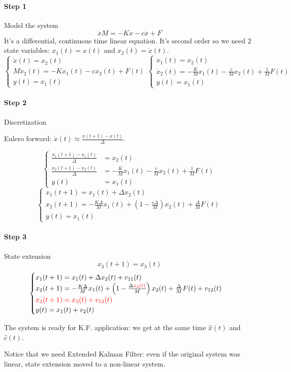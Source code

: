 \begin{example}
    \paragraph{Step 1} Model the system
    \[
        \ddot{x}M = -Kx - c\dot{x} + F
    \]
    It's a differential, continuous time linear equation.
    It's second order so we need 2 state variables: $x_1(t) = x(t)$ and $x_2(t) = \dot{x}(t)$.
    \[
        \begin{cases}
            \dot{x}(t) = x_2(t) \\
            M\dot{x}_2(t) = -Kx_1(t) -cx_2(t) + F(t) \\
            y(t) = x_1(t)
        \end{cases}
        \begin{cases}
            \dot{x}_1(t) = x_2(t) \\
            \dot{x}_2(t) = -\frac{K}{M} x_1(t) - \frac{c}{M} x_2(t) + \frac{1}{M}F(t) \\
            y(t) = x_1(t)
        \end{cases}
    \]

    \paragraph{Step 2} Discretization

    Eulero forward: $\dot{x}(t) \approx \frac{x(t+1)-x(t)}{\Delta}$.

    \[
        \begin{cases}
            \frac{x_1(t+1)-x_1(t)}{\Delta} &= x_2(t) \\
            \frac{x_2(t+1)-x_2(t)}{\Delta} &= -\frac{K}{M} x_1(t) - \frac{c}{M} x_2(t) + \frac{1}{M}F(t) \\
            y(t) &= x_1(t)
        \end{cases}
    \]
    \[
        \begin{cases}
            x_1(t+1) = x_1(t) + \Delta x_2(t) \\
            x_2(t+1) = -\frac{K\Delta}{M}x_1(t) + \left(1-\frac{c\Delta}{M}\right)x_2(t) + \frac{\Delta}{M}F(t) \\
            y(t) = x_1(t)
        \end{cases}
    \]

    \paragraph{Step 3} State extension
    \[
        x_3(t+1) = x_3(t)
    \]
    \[
        \begin{cases}
            x_1(t+1) = x_1(t) + \Delta x_2(t) + v_{11}(t) \\
            x_2(t+1) = -\frac{K\Delta}{M}x_1(t) + \left(1-\frac{\Delta {\color{red}x_3(t)}}{M}\right)x_2(t) + \frac{\Delta}{M}F(t) + v_{12}(t) \\
            {\color{red}x_3(t+1) = x_3(t) + v_{13}(t)} \\
            y(t) = x_1(t) + v_2(t)
        \end{cases}
    \]

    The system is ready for K.F. application: we get at the same time $\hat{x}(t)$ and $\hat{c}(t)$.

    Notice that we need Extended Kalman Filter: even if the original system was linear, state extension moved to a non-linear system.
\end{example}
